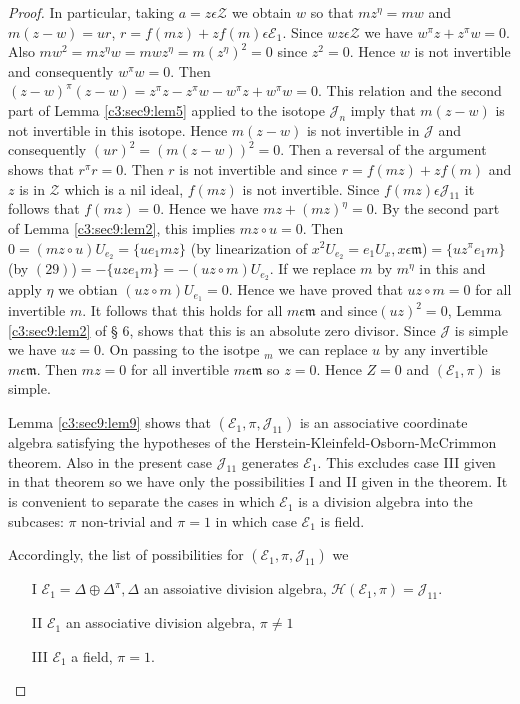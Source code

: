 \begin{proof}
In particular, taking $a=z\epsilon \mathscr{Z}$ we obtain $w$ so that
$mz^{\eta}=mw$ and $m(z-w)=ur$, $r=f(mz)+zf(m)\epsilon
\mathcal{E}_1$. Since $wz\epsilon \mathscr{Z}$ we have
$w^{\pi}z+z^{\pi}w=0$. Also
$mw^{2}=mz^{\eta}w=mwz^{\eta}=m(z^{\eta})^{2}=0$ since
$z^{2}=0$. Hence $w$ is not invertible and consequently
$w^{\pi}w=0$. Then
$(z-w)^{\pi}(z-w)=z^{\pi}z-z^{\pi}w-w^{\pi}z+w^{\pi}w=0$. This
relation and the second part of Lemma \ref{c3:sec9:lem5} applied to the isotope
$\mathscr{J}_n$ imply that $m(z-w)$ is not invertible in this
isotope. Hence $m(z-w)$ is not invertible in $\mathscr{J}$ and
consequently $(ur)^{2}=(m(z-w))^{2}=0$. Then a reversal of the
argument shows that $r^{\pi}r=0$. Then $r$ is not invertible and since
$r=f(mz)+zf(m)$ and $z$ is in $\mathscr{Z}$ which is a  nil ideal,
$f(mz)$ is not invertible. Since $f(mz)\epsilon \mathscr{J}_{11}$ it
follows that $f(mz)=0$. Hence we have $mz+(mz)^{\eta}=0$. By the
second part of Lemma \ref{c3:sec9:lem2}, this implies $mz\circ u=0$. Then $0=(mz\circ
u)U_{e_2}=\{u e_1 mz\}$ (by linearization of
$x^{2}U_{e_2}=e_1U_x,x\epsilon \mathfrak{m}$)$=\{uz^{\pi}e_1m\}$ (by
$(29)$)$=-\{uz e_1 m\}=-(uz\circ m)U_{e_2}$. If we replace $m$ by
$m^{\eta}$ in this and apply $\eta$ we obtian $(u z\circ
m)U_{e_1}=0$. Hence we have proved that $uz\circ m=0$ for all
invertible $m$. It follows that this holds for all $m\epsilon
\mathfrak{m}$ and since\pageoriginale $(uz)^{2}=0$, Lemma
\ref{c3:sec9:lem2} of \S 
$6$, shows that this is an absolute zero divisor. Since $\mathscr{J}$
is simple we have $uz=0$. On passing to the isotpe $_m$ we can replace
$u$ by any invertible $m\epsilon \mathfrak{m}$. Then $mz=0$ for all
invertible $m\epsilon \mathfrak{m}$ so $z=0$. Hence $Z=0$
and $(\mathcal{E}_1,\pi)$ is simple.

Lemma \ref{c3:sec9:lem9} shows that $(\mathcal{E}_1,\pi,
\mathscr{J}_{11})$ is an 
associative coordinate algebra satisfying the hypotheses of the
Herstein-Kleinfeld-Osborn-\break McCrimmon theorem. Also in the present case
$\mathscr{J}_{11}$ generates $\mathcal{E}_1$. This excludes case III
given in that theorem so we have only the possibilities I and II
given in the theorem. It is convenient to separate the cases in
which $\mathcal{E}_1$ is a division algebra into the subcases: $\pi$
non-trivial and $\pi=1$  in which case $\mathcal{E}_1$ is field.

Accordingly, the list of possibilities for $(\mathcal{E}_1,\pi,
\mathscr{J}_{11})$ we 
\begin{itemize}
\item[I] $\mathcal{E}_1=\Delta \oplus \Delta^{\pi},\Delta$ an
  assoiative division algebra,
  $\mathscr{H}(\mathcal{E}_1,\pi)=\mathscr{J}_{11}$.
\item[II] $\mathcal{E}_1$ an associative division algebra, $\pi\neq 1$
\item[III] $\mathcal{E}_1$ a field, $\pi=1$.
\end{itemize}
\end{proof}

